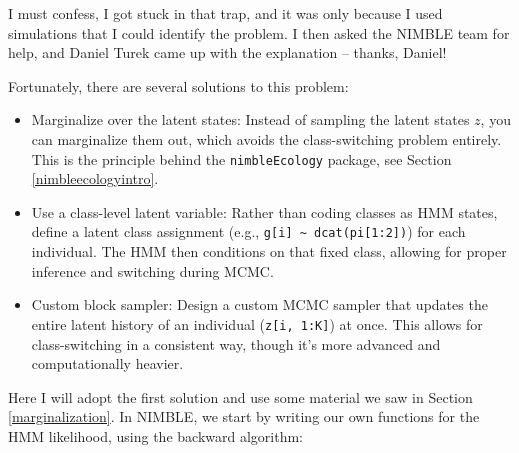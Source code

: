\documentclass[
  12pt,
]{krantz}
\begin{document}
I must confess, I got stuck in that trap, and it was only because I used simulations that I could identify the problem. I then asked the NIMBLE team for help, and Daniel Turek came up with the explanation -- thanks, Daniel!

Fortunately, there are several solutions to this problem:

\begin{itemize}
\item
  Marginalize over the latent states: Instead of sampling the latent states \(z\), you can marginalize them out, which avoids the class-switching problem entirely. This is the principle behind the \texttt{nimbleEcology} package, see Section \ref{nimbleecologyintro}.
\item
  Use a class-level latent variable: Rather than coding classes as HMM states, define a latent class assignment (e.g., \texttt{g{[}i{]}\ \textasciitilde{}\ dcat(pi{[}1:2{]})}) for each individual. The HMM then conditions on that fixed class, allowing for proper inference and switching during MCMC.
\item
  Custom block sampler: Design a custom MCMC sampler that updates the entire latent history of an individual (\texttt{z{[}i,\ 1:K{]}}) at once. This allows for class-switching in a consistent way, though it's more advanced and computationally heavier.
\end{itemize}

Here I will adopt the first solution and use some material we saw in Section \ref{marginalization}. In NIMBLE, we start by writing our own functions for the HMM likelihood, using the backward algorithm:
\end{document}
